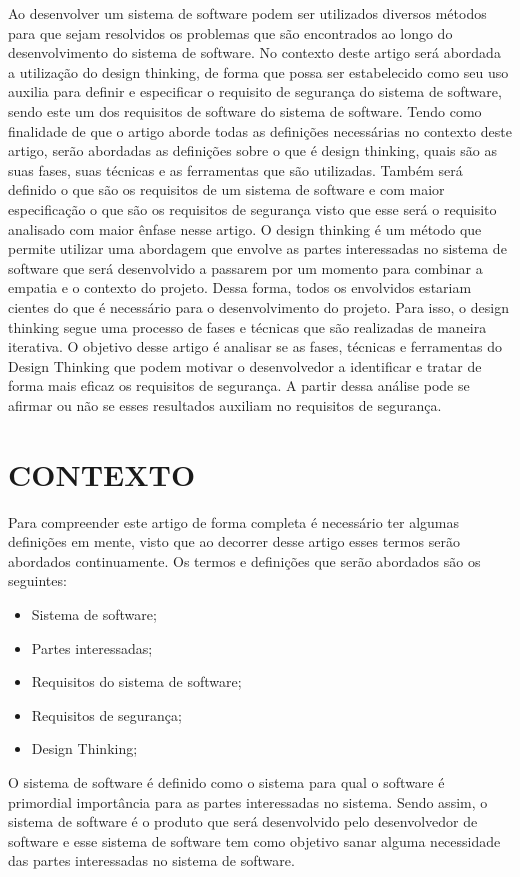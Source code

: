 \documentclass[a4paper,twoside]{article}
\begin{document}
Ao desenvolver um sistema de software podem ser utilizados diversos métodos para que sejam resolvidos os problemas que são encontrados ao longo do desenvolvimento do sistema de software. No contexto deste artigo será abordada a utilização do design thinking, de forma que possa ser estabelecido  como seu uso auxilia para definir e especificar o requisito de segurança do sistema de software, sendo este um dos requisitos de software do sistema de software. Tendo como finalidade de que o artigo aborde todas as definições necessárias no contexto deste artigo, serão abordadas as definições sobre o que é design thinking, quais são as suas fases, suas técnicas e as ferramentas que são utilizadas. Também será definido o que são os requisitos de um sistema de software e com maior especificação o que são os requisitos de segurança visto que esse será o requisito analisado com maior ênfase nesse artigo. 
O design thinking é um método que permite utilizar uma abordagem que envolve as partes interessadas no sistema de software que será desenvolvido a passarem por um momento para combinar a empatia e o contexto do projeto. Dessa forma, todos os envolvidos estariam cientes do que é necessário para o desenvolvimento do projeto. Para isso, o design thinking segue uma processo de fases e técnicas que são realizadas de maneira iterativa.
O objetivo desse artigo é analisar se as fases, técnicas e ferramentas do Design Thinking que podem motivar o desenvolvedor a identificar e tratar de forma mais eficaz os requisitos de segurança. A partir dessa análise pode se afirmar ou não se esses resultados auxiliam no requisitos de segurança\cite{Definicao}\cite{Sommerville_2011_texbook}.
\label{sec:introduction}

\section{\uppercase{Contexto}}

Para compreender este artigo de forma completa é necessário ter algumas definições em mente, visto que ao decorrer desse artigo esses termos serão abordados continuamente. Os termos e definições que serão abordados são os seguintes:
\begin{itemize}
    \item Sistema de software;
    \item Partes interessadas;
    \item Requisitos do sistema de software;
    \item Requisitos de segurança;
    \item Design Thinking;
\end{itemize}
O sistema de software é definido como o sistema para qual o software é primordial importância para as partes interessadas no sistema\cite{sevocab}. Sendo assim, o sistema de software é o produto que será desenvolvido pelo desenvolvedor de software e esse sistema de software tem como objetivo sanar alguma necessidade das partes interessadas no sistema de software. 
\end{document}
